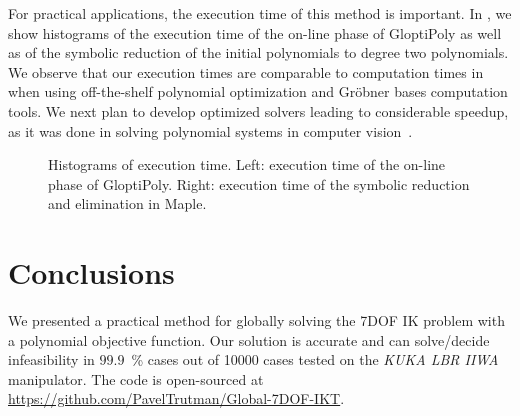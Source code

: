 For practical applications, the execution time of this method is important. In , we show histograms of the execution time of the on-line phase of GloptiPoly as well as of the symbolic reduction of the initial polynomials to degree two polynomials. We observe that our execution times are comparable to computation times in~\cite{Dai2019} when using off-the-shelf polynomial optimization and Gr\"obner bases computation tools. We next plan to develop optimized solvers leading to considerable speedup, as it was done in solving polynomial systems in computer vision~\cite{Larsson2018}.

\begin{figure}[t]
  \resizebox{0.524\textwidth}{!}{
    
  }%
  \resizebox{0.45\textwidth}{!}{
    
  }
  \caption{Histograms of execution time. Left: execution time of the on-line phase of GloptiPoly. Right: execution time of the symbolic reduction and elimination in Maple.}
\end{figure}

\section{Conclusions}
We presented a practical method for globally solving the 7DOF IK problem with a polynomial objective function. Our solution is accurate and can solve/decide infeasibility in $99.9$~\% cases out of \num{10000} cases tested on the \textit{KUKA LBR IIWA} manipulator. The code is open-sourced at \url{https://github.com/PavelTrutman/Global-7DOF-IKT}.

